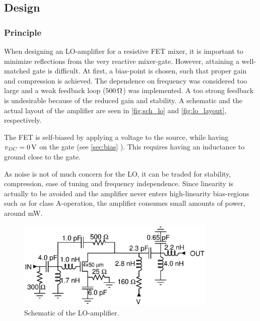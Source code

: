 		\subsection{Design}
			\subsubsection{Principle}
				When designing an LO-amplifier for a resistive FET mixer, it is important to minimize reflections from the very reactive mixer-gate. However, attaining a well-matched gate is difficult.\autocite{yhland1999} At first, a bias-point is chosen, such that proper gain and compression is achieved. The dependence on frequency was considered too large and a weak feedback loop ($\unit[500]{\Omega}$) was implemented. A too strong feedback is undesirable because of the reduced gain and stability. A schematic and the actual layout of the amplifier are seen in \autoref{fig:sch_lo} and \autoref{fig:lo_layout}, respectively.


	The FET is self-biased by applying a voltage to the source, while having $v_{DC}=\unit[0]{V}$ on the gate (see \ref{sec:bias} ). This requires having an inductance to ground close to the gate.


			As noise is not of much concern for the LO, it can be traded for stability, compression, ease of tuning and frequency independence. Since linearity is actually to be avoided and the amplifier never enters high-linearity bias-regions such as for class A-operation, the amplifier consumes small amounts of power, around \unit[100]{mW}.




			\begin{figure}[hbt!]
				\centering
				\includegraphics[width=0.85\textwidth]{fig/amplifiers/lo/sch_lo}
				\caption[LO-amplifier schematic]{Schematic of the LO-amplifier.}\label{fig:sch_lo}
			\end{figure}


